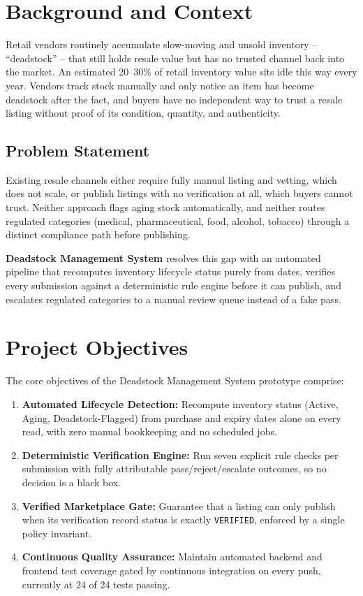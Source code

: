 \documentclass[11pt,a4paper]{report}
\begin{document}
\section{Background and Context}
Retail vendors routinely accumulate slow-moving and unsold inventory --
``deadstock'' -- that still holds resale value but has no trusted channel
back into the market. An estimated 20--30\% of retail inventory value sits
idle this way every year. Vendors track stock manually and only notice an
item has become deadstock after the fact, and buyers have no independent
way to trust a resale listing without proof of its condition, quantity, and
authenticity.

\subsection{Problem Statement}
Existing resale channels either require fully manual listing and vetting,
which does not scale, or publish listings with no verification at all,
which buyers cannot trust. Neither approach flags aging stock automatically,
and neither routes regulated categories (medical, pharmaceutical, food,
alcohol, tobacco) through a distinct compliance path before publishing.

\textbf{Deadstock Management System} resolves this gap with an automated
pipeline that recomputes inventory lifecycle status purely from dates,
verifies every submission against a deterministic rule engine before it can
publish, and escalates regulated categories to a manual review queue
instead of a fake pass.

\section{Project Objectives}
The core objectives of the Deadstock Management System prototype comprise:

\begin{enumerate}[leftmargin=0.8cm]
    \item \textbf{Automated Lifecycle Detection:} Recompute inventory status (Active, Aging, Deadstock-Flagged) from purchase and expiry dates alone on every read, with zero manual bookkeeping and no scheduled jobs.
    \item \textbf{Deterministic Verification Engine:} Run seven explicit rule checks per submission with fully attributable pass/reject/escalate outcomes, so no decision is a black box.
    \item \textbf{Verified Marketplace Gate:} Guarantee that a listing can only publish when its verification record status is exactly \texttt{VERIFIED}, enforced by a single policy invariant.
    \item \textbf{Continuous Quality Assurance:} Maintain automated backend and frontend test coverage gated by continuous integration on every push, currently at 24 of 24 tests passing.
\end{enumerate}
\end{document}
